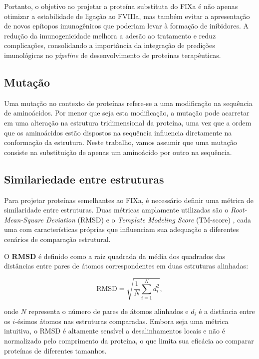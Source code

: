 Portanto, o objetivo ao projetar a proteína substituta do FIXa é não apenas otimizar a estabilidade de ligação ao FVIIIa, 
mas também evitar a apresentação de novos epítopos imunogênicos que poderiam levar à formação de inibidores. 
A redução da imunogenicidade melhora a adesão ao tratamento e reduz complicações, 
consolidando a importância da integração de predições imunológicas 
no \textit{pipeline} de desenvolvimento de proteínas terapêuticas.


\subsection{Mutação}
Uma mutação no contexto de proteínas refere-se a uma modificação na sequência de aminoácidos. 
Por menor que seja esta modificação, a mutação pode acarretar em uma alteração na estrutura tridimensional da proteína,
uma vez que a ordem que os aminoácidos estão dispostos na sequência influencia diretamente na conformação da estrutura. 
Neste trabalho, vamos assumir que uma mutação consiste na substituição de apenas um aminoácido por outro na sequência. 

\subsection{Similariedade entre estruturas}
\label{subsection:TMScore}  
Para projetar proteínas semelhantes ao FIXa, é necessário definir uma métrica de similaridade entre estruturas.
Duas métricas amplamente utilizadas são o \textit{Root-Mean-Square Deviation} (RMSD) 
e o \textit{Template Modeling Score} (TM-score) \cite{tmscore},
cada uma com características próprias que influenciam sua adequação a diferentes cenários de comparação estrutural.

O \textbf{RMSD} é definido como a raiz quadrada da média dos quadrados das distâncias 
entre pares de átomos correspondentes em duas estruturas alinhadas:

\begin{equation}
    \text{RMSD} = \sqrt{\frac{1}{N} \sum_{i=1}^{N} d_i^2},
\end{equation}

onde \(N\) representa o número de pares de átomos alinhados e \(d_i\) é a distância entre os \(i\)-ésimos átomos nas estruturas comparadas. 
Embora seja uma métrica intuitiva, o RMSD é altamente sensível a desalinhamentos locais e não é normalizado pelo comprimento da proteína,
o que limita sua eficácia ao comparar proteínas de diferentes tamanhos.

